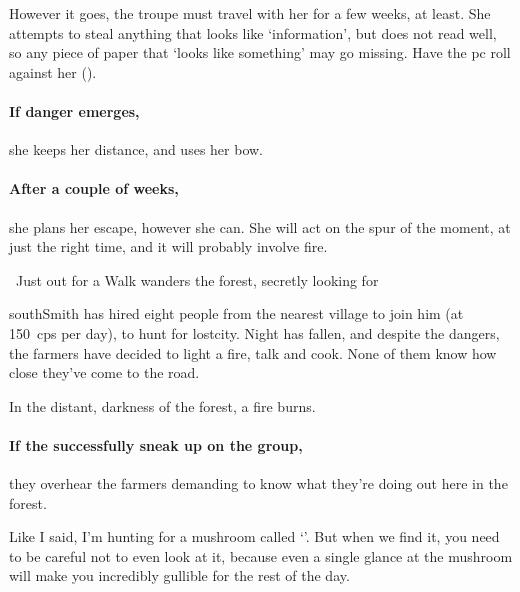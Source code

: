 However it goes, the troupe must travel with her for a few weeks, at least.
She attempts to steal anything that looks like `information', but does not read well, so any piece of paper that `looks like something' may go missing.
Have the \gls{pc} roll  against her  (\tn).

\paragraph{If danger emerges,}
she keeps her distance, and uses her bow.

\paragraph{After a couple of weeks,}
she plans her escape, however she can.
She will act on the spur of the moment, at just the right time, and it will probably involve fire.

\southRogue
\label{southRogue}

{~Just out for a Walk}%
{ wanders the forest, secretly looking for }%

\begin{exampletext}
  \Gls{southSmith} has hired eight people from the nearest \gls{village} to join him (at 150~\glspl{cp} per day), to hunt for \gls{lostcity}.
  Night has fallen, and despite the dangers, the farmers have decided to light a fire, talk and cook.
  None of them know how close they've come to the road.
\end{exampletext}

\begin{boxtext}
  In the distant, darkness of the forest, a fire burns.
\end{boxtext}

\paragraph{If the successfully sneak up on the group,}
they overhear the farmers demanding to know what they're doing out here in the forest.

\begin{speechtext}
  Like I said, I'm hunting for a mushroom called `'.
  But when we find it, you need to be careful not to even look at it, because even a single glance at the mushroom will make you incredibly gullible for the rest of the day.
\end{speechtext}

